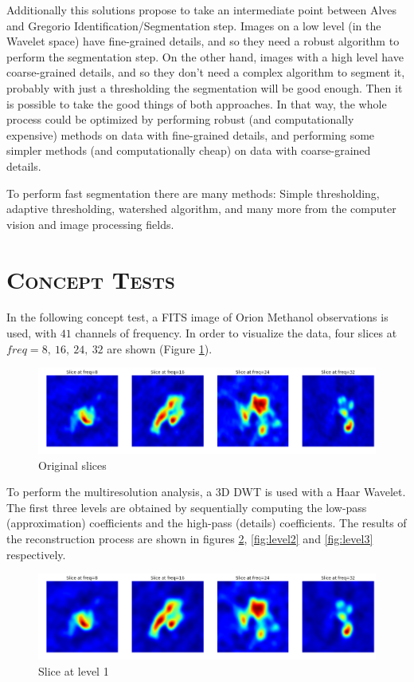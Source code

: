 \documentclass[letter, 11pt]{article}
\begin{document}
Additionally this solutions propose to take an intermediate point between Alves and Gregorio Identification/Segmentation step. Images on a low level (in the Wavelet space) have fine-grained details, and so they need a robust algorithm to perform the segmentation step. On the other hand, images with a high level have coarse-grained details, and so they don't need a complex algorithm to segment it, probably with just a thresholding the segmentation will be good enough. Then it is possible to take the good things of both approaches. In that way, the whole process could be optimized by performing robust (and computationally expensive) methods on data with fine-grained details, and performing some simpler methods (and computationally cheap) on data with coarse-grained details.

To perform fast segmentation there are many methods: Simple thresholding, adaptive thresholding, watershed algorithm, and many more from the computer vision and image processing fields.


\section{\textsc{Concept Tests}}

In the following concept test, a FITS image of Orion Methanol observations is used, with $41$ channels of frequency. In order to visualize the data, four slices at $freq=8,\ 16,\ 24,\ 32$ are shown (Figure \ref{fig:level0}).
\begin{figure}[htpb!]
\centering
\includegraphics[width=14cm]{level0}
\caption{Original slices}
\label{fig:level0}
\end{figure}

To perform the multiresolution analysis, a 3D DWT is used with a Haar Wavelet. The first three levels are obtained by sequentially computing the low-pass (approximation) coefficients and the high-pass (details) coefficients. The results of the reconstruction process are shown in figures \ref{fig:level1}, \ref{fig:level2} and \ref{fig:level3} respectively.

\begin{figure}[htpb!]
\centering
\includegraphics[width=14cm]{level1}
\caption{Slice at level 1}
\label{fig:level1}
\end{figure}
\end{document}

